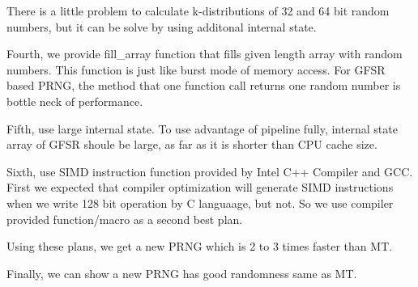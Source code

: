 \documentclass{amsart}
\theoremstyle{definition}
\begin{document}
There is a little problem to calculate k-distributions of 32 and
64 bit random numbers, but it can be solve by using additonal 
internal state.

Fourth,  we provide fill\_array function that fills 
given length array with random numbers. This function is
just like burst mode of memory access. For GFSR based PRNG,
the method that one function call returns one random number
is bottle neck of performance.

Fifth, use large internal state. To use advantage of pipeline fully,
internal state array of GFSR shoule be large, as far as it is
shorter than CPU cache size.

Sixth, use SIMD instruction function provided by Intel C++ Compiler
and GCC. First we expected that compiler optimization will
generate SIMD instructions when we write 128 bit operation 
by C languaage, but not. So we use compiler provided function/macro
as a second best plan.

Using these plans, we get a new PRNG which is 2 to 3 times 
faster than MT.

Finally, we can show a new PRNG has good randomness same as MT.
\end{document}
